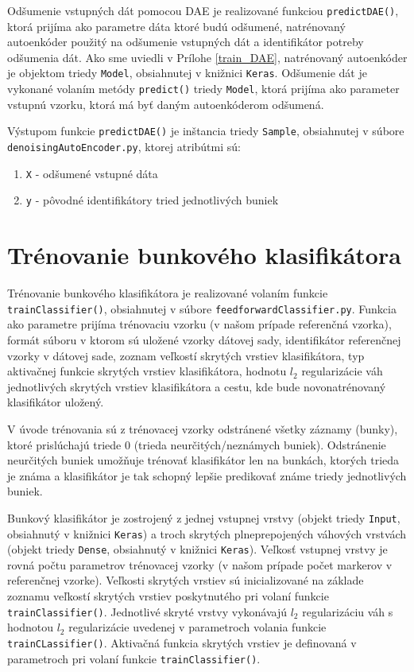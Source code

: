Odšumenie vstupných dát pomocou DAE je realizované funkciou \texttt{predictDAE()}, ktorá prijíma ako parametre dáta ktoré budú odšumené, natrénovaný autoenkóder použitý na odšumenie vstupných dát a identifikátor potreby odšumenia dát. Ako sme uviedli v Prílohe \ref{train_DAE}, natrénovaný autoenkóder je objektom triedy \texttt{Model}, obsiahnutej v knižnici \texttt{Keras}. Odšumenie dát je vykonané volaním metódy \texttt{predict()} triedy \texttt{Model}, ktorá prijíma ako parameter vstupnú vzorku, ktorá má byť daným autoenkóderom odšumená. 

Výstupom funkcie \texttt{predictDAE()} je inštancia triedy \texttt{Sample}, obsiahnutej v súbore \texttt{denoisingAutoEncoder.py}, ktorej atribútmi sú:
\begin{enumerate}
    \item \texttt{X} - odšumené vstupné dáta
    \item \texttt{y} - pôvodné identifikátory tried jednotlivých buniek
\end{enumerate}

\section{Trénovanie bunkového klasifikátora}
\label{trainFF}

Trénovanie bunkového klasifikátora je realizované volaním funkcie \texttt{trainClassifier()}, obsiahnutej v súbore \texttt{feedforwardClassifier.py}. Funkcia ako parametre prijíma trénovaciu vzorku (v našom prípade referenčná vzorka), formát súboru v ktorom sú uložené vzorky dátovej sady, identifikátor referenčnej vzorky v dátovej sade, zoznam veľkostí skrytých vrstiev klasifikátora, typ aktivačnej funkcie skrytých vrstiev klasifikátora, hodnotu $l_2$ regularizácie váh jednotlivých skrytých vrstiev klasifikátora a cestu, kde bude novonatrénovaný klasifikátor uložený.

V úvode trénovania sú z trénovacej vzorky odstránené všetky záznamy (bunky), ktoré prislúchajú triede $0$ (trieda neurčitých/neznámych buniek). Odstránenie neurčitých buniek umožňuje trénovať klasifikátor len na bunkách, ktorých trieda je známa a klasifikátor je tak schopný lepšie predikovať známe triedy jednotlivých buniek. 

Bunkový klasifikátor je zostrojený z jednej vstupnej vrstvy (objekt triedy \texttt{Input}, obsiahnutý v knižnici \texttt{Keras}) a troch skrytých plneprepojených váhových vrstvách (objekt triedy \texttt{Dense}, obsiahnutý v knižnici \texttt{Keras}). Veľkosť vstupnej vrstvy je rovná počtu parametrov trénovacej vzorky (v našom prípade počet markerov v referenčnej vzorke). Veľkosti skrytých vrstiev sú inicializované na základe zoznamu veľkostí skrytých vrstiev poskytnutého pri volaní funkcie \texttt{trainClassifier()}. Jednotlivé skryté vrstvy vykonávajú $l_2$ regularizáciu váh s hodnotou $l_2$ regularizácie uvedenej v parametroch volania funkcie \texttt{trainCLassifier()}. Aktivačná funkcia skrytých vrstiev je definovaná v parametroch pri volaní funkcie \texttt{trainClassifier()}.

